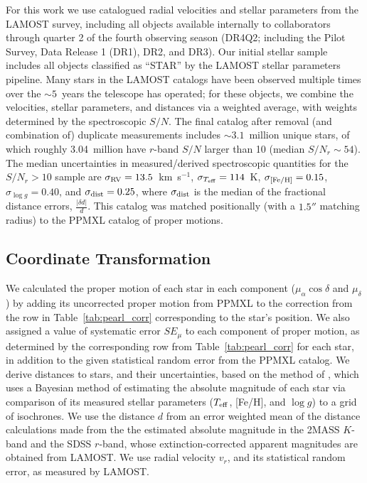\documentclass[11pt,preprint]{aastex6}
\begin{document}
For this work we use catalogued radial velocities and stellar parameters from the LAMOST survey, including all objects available internally to collaborators through quarter 2 of the fourth observing season (DR4Q2; including the Pilot Survey, Data Release 1 (DR1), DR2, and DR3). Our initial stellar sample includes all objects classified as ``STAR'' by the LAMOST stellar parameters pipeline. 
Many stars in the LAMOST catalogs have been observed multiple times over the $\sim5$~years the telescope has operated; for these objects, we combine the velocities, stellar parameters, and distances via a weighted average, with weights determined by the spectroscopic $S/N$. The final catalog after removal (and combination of) duplicate measurements includes $\sim3.1$~million unique stars, of which roughly 3.04~million have $r$-band $S/N$ larger than 10 (median $S/N_r \sim 54$). The median uncertainties in measured/derived spectroscopic quantities for the $S/N_r > 10$ sample are $\sigma_{\rm RV} = 13.5$~km~s$^{-1}$, $\sigma_{T_{\rm eff}} = 114$~K, $\sigma_{\rm [Fe/H]} = 0.15$, $\sigma_{\log{g}} = 0.40$, and $\sigma_{\rm dist} = 0.25$, where $\sigma_{\rm dist}$ is the median of the fractional distance errors, $\frac{|\delta d|}{d}$. This catalog was matched positionally (with a $1.5''$ matching radius) to the PPMXL \citep{Roeser2010} catalog of proper motions.

\subsection{Coordinate Transformation} \label{sec:transformation}

We calculated the proper motion of each star in each component ($\mu_\alpha \cos{\delta}$ and $\mu_\delta$) by adding its uncorrected proper motion from PPMXL to the correction from the row in Table~\ref{tab:pearl_corr} corresponding to the star's position.
We also assigned a value of systematic error $SE_{\mu}$ to each component of proper motion, as determined by the corresponding row from Table~\ref{tab:pearl_corr} for each star, in addition to the given statistical random error from the PPMXL catalog.
We derive distances to stars, and their uncertainties, based on the method of \citet{Carlin2015}, which uses a Bayesian method of estimating the absolute magnitude of each star via comparison of its measured stellar parameters ($T_{\rm eff}$, [Fe/H], and $\log{g}$) to a grid of isochrones.
We use the distance $d$ from an error weighted mean of the distance calculations made from the the estimated absolute magnitude in the 2MASS $K$-band and the SDSS $r$-band, whose extinction-corrected \citep{Schlegel1998} apparent magnitudes are obtained from LAMOST.
We use radial velocity $v_r$, and its statistical random error, as measured by LAMOST.
\end{document}
